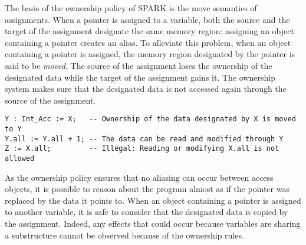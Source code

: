 \documentclass[runningheads]{llncs}
\begin{document}
The basis of the ownership policy of SPARK is the move semantics of assignments. When a pointer is assigned to a variable, both the source and the target of the assignment designate the same memory region: assigning an object containing a pointer creates an alias.
To alleviate this problem, when an object containing a pointer is assigned, the memory region designated by the pointer is said to be \emph{moved}. The source of the assignment loses the ownership of the designated data while the target of the assignment gains it. The ownership system makes sure that the designated data is not accessed again through the source of the assignment.
\begin{lstlisting}
Y : Int_Acc := X;   -- Ownership of the data designated by X is moved to Y
Y.all := Y.all + 1; -- The data can be read and modified through Y
Z := X.all;         -- Illegal: Reading or modifying X.all is not allowed
\end{lstlisting}
As the ownership policy ensures that no aliasing can occur between access objects, it is possible to reason about the program almost as if the pointer was replaced by the data it points to. When an object containing a pointer is assigned to another variable, it is safe to consider that the designated data is copied by the assignment. Indeed, any effects that could occur because variables are sharing a substructure cannot be observed because of the ownership rules.
\end{document}
